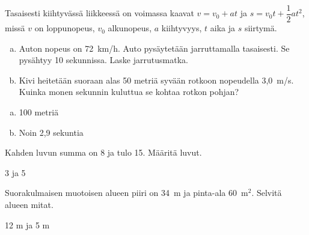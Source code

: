 \begin{tehtava}
    Tasaisesti kiihtyvässä liikkeessä on voimassa kaavat $v = v_0 + at$ ja $s = v_0t + \dfrac{1}{2}at^2$, missä $v$ on loppunopeus, $v_0$ alkunopeus, $a$ kiihtyvyys, $t$ aika ja $s$ siirtymä. 
		\begin{enumerate}[a)]
            \item Auton nopeus on 72~km/h. Auto pysäytetään jarruttamalla tasaisesti. Se pysähtyy 10 sekunnissa. Laske jarrutusmatka.
            \item Kivi heitetään suoraan alas 50 metriä syvään rotkoon nopeudella 3,0~m/s. Kuinka monen sekunnin kuluttua se kohtaa rotkon pohjan?
        \end{enumerate}
    \begin{vastaus}
        \begin{enumerate}[a)]
            \item 100 metriä
            \item Noin 2,9 sekuntia
        \end{enumerate}
    \end{vastaus}
\end{tehtava}

\begin{tehtava}
    Kahden luvun summa on 8 ja tulo 15. Määritä luvut. 
    \begin{vastaus}
		3 ja 5
    \end{vastaus}
\end{tehtava}

\begin{tehtava}
    Suorakulmaisen muotoisen alueen piiri on 34~m ja pinta-ala 60~m$^2$. Selvitä alueen mitat. 
    \begin{vastaus}
		12 m ja 5 m
    \end{vastaus}
\end{tehtava}

